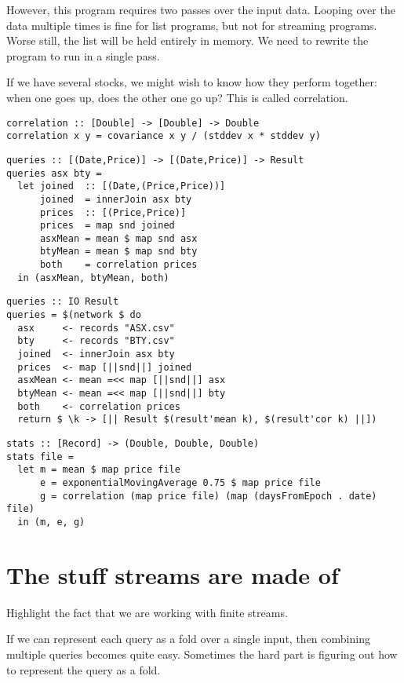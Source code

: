 However, this program requires two passes over the input data.
Looping over the data multiple times is fine for list programs, but not for streaming programs.
Worse still, the list will be held entirely in memory.
We need to rewrite the program to run in a single pass.

If we have several stocks, we might wish to know how they perform together: when one goes up, does the other one go up?
This is called correlation.

\begin{lstlisting}
correlation :: [Double] -> [Double] -> Double
correlation x y = covariance x y / (stddev x * stddev y)
\end{lstlisting}

\begin{lstlisting}
queries :: [(Date,Price)] -> [(Date,Price)] -> Result
queries asx bty =
  let joined  :: [(Date,(Price,Price))]
      joined  = innerJoin asx bty
      prices  :: [(Price,Price)]
      prices  = map snd joined
      asxMean = mean $ map snd asx
      btyMean = mean $ map snd bty
      both    = correlation prices
  in (asxMean, btyMean, both)
\end{lstlisting}

\begin{lstlisting}
queries :: IO Result
queries = $(network $ do
  asx     <- records "ASX.csv"
  bty     <- records "BTY.csv"
  joined  <- innerJoin asx bty
  prices  <- map [||snd||] joined
  asxMean <- mean =<< map [||snd||] asx
  btyMean <- mean =<< map [||snd||] bty
  both    <- correlation prices
  return $ \k -> [|| Result $(result'mean k), $(result'cor k) ||])
\end{lstlisting}


\begin{lstlisting}
stats :: [Record] -> (Double, Double, Double)
stats file =
  let m = mean $ map price file
      e = exponentialMovingAverage 0.75 $ map price file
      g = correlation (map price file) (map (daysFromEpoch . date) file)
  in (m, e, g)
\end{lstlisting}

\section{The stuff streams are made of}

Highlight the fact that we are working with finite streams.

If we can represent each query as a fold over a single input, then combining multiple queries becomes quite easy.
Sometimes the hard part is figuring out how to represent the query as a fold.


